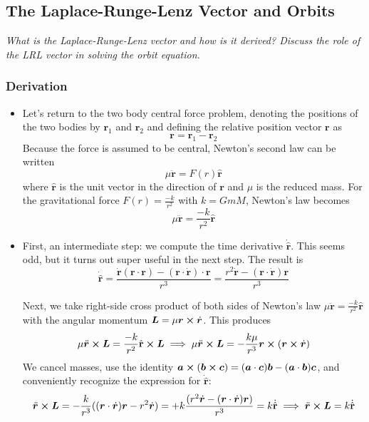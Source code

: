 \documentclass[11pt, a4paper]{article}
\newcommand{\uvec}[1]{\hat{\mathbf{#1}}}
\newcommand{\bdot}[1]{\dot{\bm{#1}}}
\newcommand{\bddot}[1]{\ddot{\bm{#1}}}
\begin{document}
\subsection{The Laplace-Runge-Lenz Vector and Orbits}
\textit{What is the Laplace-Runge-Lenz vector and how is it derived? Discuss the role of the LRL vector in solving the orbit equation.}

\subsubsection{Derivation}
\begin{itemize}
	\item Let's return to the two body central force problem, denoting the positions of the two bodies by $ \bm{r}_{1} $ and $ \bm{r}_{2} $ and defining the relative position vector $ \bm{r} $ as
	\begin{equation*}
		\bm{r} = \bm{r}_{1} - \bm{r}_{2}
	\end{equation*}
	Because the force is assumed to be central, Newton's second law can be written
	\begin{equation*}
		\mu \bddot{r} = F(r) \uvec{r}
	\end{equation*}
	where $ \uvec{r} $ is the unit vector in the direction of $ \bm{r} $ and $ \mu $ is the reduced mass. For the gravitational force $ F(r) = \frac{-k}{r^{2}} $ with $ k = GmM $, Newton's law becomes
	\begin{equation*}
		\mu \bddot{r} = \frac{-k}{r^{2}} \uvec{r}
	\end{equation*}
	
	\item First, an intermediate step: we compute the time derivative $ \dot{\uvec{r}} $. This seems odd, but it turns out super useful in the next step. The result is
	\begin{equation*}
		\dot{\uvec{r}} = \frac{\bdot{r}(\bm{r}\cdot \bm{r}) - (\bm{r}\cdot \bdot{r})\cdot \bm{r}}{r^{3}} = \frac{r^{2}\bdot{r} - (\bm{r}\cdot \bdot{r}) \bm{r}}{r^{3}}
	\end{equation*}
	
	Next, we take right-side cross product of both sides of Newton's law $ \mu \bddot{r} = \frac{-k}{r^{2}} \uvec{r} $ with the angular momentum  $ \bm{L} = \mu \bm{r} \cross \bdot{r} $. This produces
	\begin{equation*}
		\mu \bddot{r}\cross \bm{L} = \frac{-k}{r^{2}} \uvec{r} \cross \bm{L} \implies \mu \bddot{r}\cross \bm{L} = - \frac{k\mu}{r^{3}} \bm{r} \cross (\bm{r} \cross \bdot{r})
	\end{equation*}
	We cancel masses, use the identity $ \bm{a} \cross (\bm{b} \cross \bm{c}) = (\bm{a} \cdot \bm{c})\bm{b} - (\bm{a} \cdot \bm{b})\bm{c} $, and conveniently recognize the expression for $ \dot{\uvec{r}} $:
	\begin{equation*}
		\bddot{r}\cross \bm{L} = - \frac{k}{r^{3}}((\bm{r}\cdot \bdot{r})\bm{r} - r^{2}\bdot{r}) = +k\frac{(r^{2}\bdot{r} - (\bm{r}\cdot \bdot{r})\bm{r})}{r^{3}} = k \dot{\uvec{r}} \implies \bddot{r}\cross \bm{L} = k \dot{\uvec{r}}
	\end{equation*}
	

\end{itemize}
\end{document}
